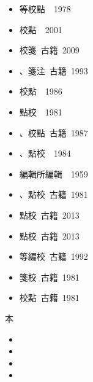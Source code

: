 \begin{enumerate}
\begin{itemize}
        \item {}等校點\ {\small {}\ 1978}
        \item {}校點\ {\small {}\ 2001}
        \item {}校箋\ {\small {}古籍\ 2009}
        \item {}、箋注\ {\small {}古籍\ 1993}
        \item {}校點\ {\small {}\ 1986}
        \item {}點校\ {\small {}\ 1981}
        \item {}、校點\ {\small {}古籍\ 1987}
        \item {}、點校\ {\small {}\ 1984}
        \item {}編輯所編輯\ {\small {}\ 1959}
        \item {}、點校\ {\small {}古籍\ 1981}
        \item {}點校\ {\small {}古籍\ 2013}
        \item {}點校\ {\small {}古籍\ 2013}
        \item {}等編校\ {\small {}古籍\ 1992}
        \item {}箋校\ {\small {}古籍\ 1981}
        \item {}校點\ {\small {}古籍\ 1981}
    \end{itemize}
    本
    \begin{itemize}
        \item {}
        \item {}
        \item {}
        \item {}

\end{itemize}
\end{enumerate}
